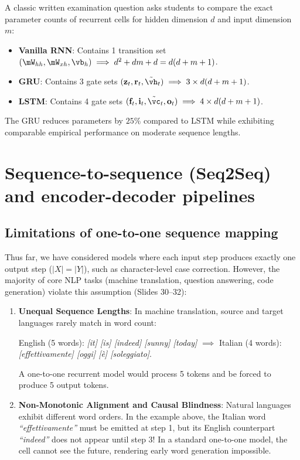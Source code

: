 \documentclass[../../main.tex]{subfiles}
\begin{document}
\begin{examinsight}
A classic written examination question asks students to compare the exact parameter counts of recurrent cells for hidden dimension $d$ and input dimension $m$:
\begin{itemize}
    \item \textbf{Vanilla RNN}: Contains 1 transition set $(\mW_{hh}, \mW_{xh}, \vb_h) \implies d^2 + dm + d = d(d + m + 1)$.
    \item \textbf{GRU}: Contains 3 gate sets $(\mathbf{z}_t, \mathbf{r}_t, \tilde{\vh}_t) \implies 3 \times d(d + m + 1)$.
    \item \textbf{LSTM}: Contains 4 gate sets $(\mathbf{f}_t, \mathbf{i}_t, \tilde{\vc}_t, \mathbf{o}_t) \implies 4 \times d(d + m + 1)$.
\end{itemize}
The GRU reduces parameters by $25\%$ compared to LSTM while exhibiting comparable empirical performance on moderate sequence lengths.
\end{examinsight}

\section{Sequence-to-sequence (Seq2Seq) and encoder-decoder pipelines}
\label{sec:seq2seq}

\subsection{Limitations of one-to-one sequence mapping}
Thus far, we have considered models where each input step produces exactly one output step ($|X| = |Y|$), such as character-level case correction. However, the majority of core NLP tasks (machine translation, question answering, code generation) violate this assumption (Slides 30--32):
\begin{enumerate}
    \item \textbf{Unequal Sequence Lengths}: In machine translation, source and target languages rarely match in word count:
    \begin{center}
    English (5 words): \textit{[it] [is] [indeed] [sunny] [today]} $\implies$ Italian (4 words): \textit{[effettivamente] [oggi] [è] [soleggiato]}.
    \end{center}
    A one-to-one recurrent model would process 5 tokens and be forced to produce 5 output tokens.
    \item \textbf{Non-Monotonic Alignment and Causal Blindness}: Natural languages exhibit different word orders. In the example above, the Italian word \textit{``effettivamente''} must be emitted at step 1, but its English counterpart \textit{``indeed''} does not appear until step 3! In a standard one-to-one model, the cell cannot see the future, rendering early word generation impossible.
\end{enumerate}
\end{document}
